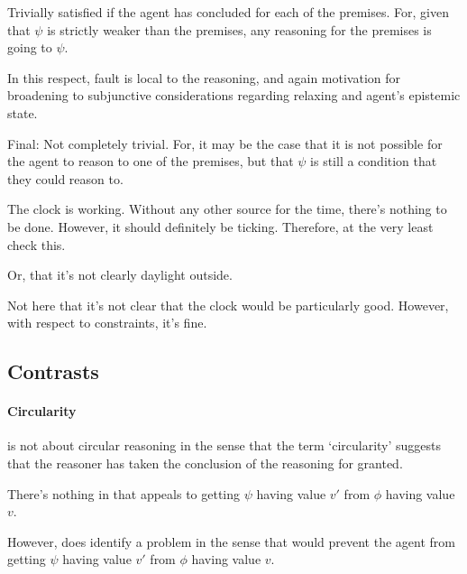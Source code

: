 \begin{note}
  Trivially satisfied if the agent has concluded for each of the premises.
  For, given that \(\psi\) is strictly weaker than the premises, any reasoning for the premises is going to \indicateV{} \(\psi\).

  In this respect, fault is local to the reasoning, and again motivation for broadening to subjunctive considerations regarding relaxing and agent's epistemic state.

  Final: Not completely trivial.
  For, it may be the case that it is not possible for the agent to reason to one of the premises, but that \(\psi\) is still a condition that they could reason to.
\end{note}

\begin{note}
  \begin{illustration}
    The clock is working.
    Without any other source for the time, there's nothing to be done.
    However, it should definitely be ticking.
    Therefore, at the very least check this.
  \end{illustration}
  Or, that it's not clearly daylight outside.

  Not here that it's not clear that the clock would be particularly good.
  However, with respect to constraints, it's fine.
\end{note}

\subsection{Contrasts}
\label{sec:contrasts}

\paragraph{Circularity}

\begin{note}
  \ideaCS{} is not about circular reasoning in the sense that the term `circularity' suggests that the reasoner has taken the conclusion of the reasoning for granted.

  There's nothing in \ideaCS{} that appeals to getting \(\psi\) having value \(v'\) from \(\phi\) having value \(v\).

  However, does identify a problem in the sense that would prevent the agent from getting \(\psi\) having value \(v'\) from \(\phi\) having value \(v\).
\end{note}

